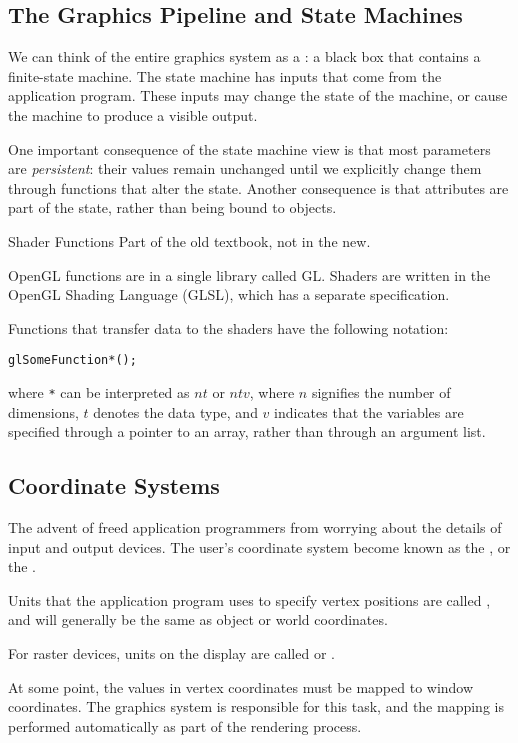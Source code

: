 \documentclass[../notes.tex]{subfiles}
\begin{document}
      \subsection{The Graphics Pipeline and State Machines}
        We can think of the entire graphics system as a :
        a black box that contains a finite-state machine.
        The state machine has inputs that come from the application program.
        These inputs may change the state of the machine, or cause the machine to produce
        a visible output.

        One important consequence of the state machine view is that most parameters are
        \emph{persistent}: their values remain unchanged until we explicitly change them
        through functions that alter the state.
        Another consequence is that attributes are part of the state,
        rather than being bound to objects.

        \begin{sidenote}{Shader Functions}
          Part of the old textbook, not in the new.

          OpenGL functions are in a single library called GL.
          Shaders are written in the OpenGL Shading Language (GLSL),
          which has a separate specification.

          Functions that transfer data to the shaders have the following notation:
          \begin{center}
            \texttt{glSomeFunction*();}
          \end{center}
          where \texttt{*} can be interpreted as $nt$ or $ntv$, where $n$ signifies the number of dimensions,
          $t$ denotes the data type, and $v$ indicates that the variables are specified through
          a pointer to an array, rather than through an argument list.
        \end{sidenote}

      \subsection{Coordinate Systems}
        The advent of  freed application programmers
        from worrying about the details of input and output devices.
        The user's coordinate system become known as the ,
        or the .

        Units that the application program uses to specify vertex positions are called
        , and will generally be the same as object or world coordinates.

        For raster devices, units on the display are called 
        or .

        At some point, the values in vertex coordinates must be mapped to window coordinates.
        The graphics system is responsible for this task,
        and the mapping is performed automatically as part of the rendering process.
\end{document}
